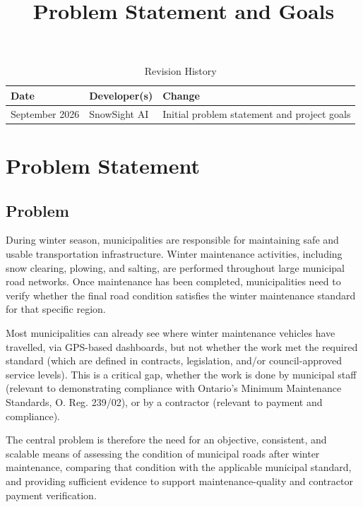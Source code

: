 \documentclass{article}
\title{Problem Statement and Goals\\\progname}
\author{\authname}
\date{}
\begin{document}
\maketitle

\begin{table}[hp]
\caption{Revision History}
\label{TblRevisionHistory}

\begin{tabularx}{\textwidth}{llX}
\toprule
\textbf{Date} & \textbf{Developer(s)} & \textbf{Change}\\
\midrule
September 2026 & SnowSight AI & Initial problem statement and project goals\\
\bottomrule
\end{tabularx}
\end{table}

\section{Problem Statement}

\subsection{Problem}

During winter season, municipalities are responsible for maintaining safe and
usable transportation infrastructure. Winter maintenance activities, including
snow clearing, plowing, and salting, are performed throughout large municipal
road networks. Once maintenance has been completed, municipalities need to verify
whether the final road condition satisfies the winter maintenance standard for that specific region.

Most municipalities can
already see where winter maintenance vehicles have travelled, via GPS-based dashboards, but not whether the work met the required standard (which are defined in
contracts, legislation, and/or council-approved service levels). This is a critical gap,
whether the work is done by municipal staff (relevant to demonstrating compliance
with Ontario’s Minimum Maintenance Standards, O. Reg. 239/02), or by a contractor (relevant to payment and compliance).


The central problem is therefore the need for an objective, consistent, and
scalable means of assessing the condition of municipal roads after winter
maintenance, comparing that condition with the applicable municipal standard,
and providing sufficient evidence to support maintenance-quality and contractor
payment verification.
\end{document}
